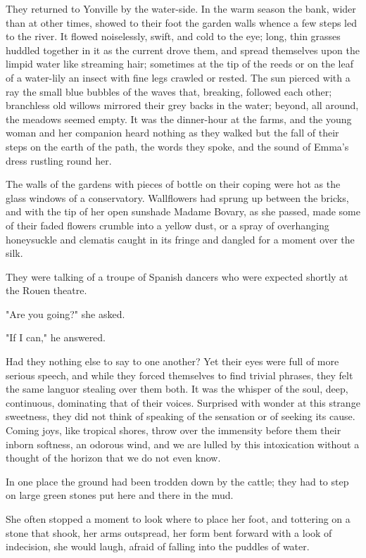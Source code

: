\documentclass[11pt,twocolumn]{ltugboat}
\begin{document}
They returned to Yonville by the water-side. In the warm season the
bank, wider than at other times, showed to their foot the garden walls
whence a few steps led to the river. It flowed noiselessly, swift,
and cold to the eye; long, thin grasses huddled together in it as the
current drove them, and spread themselves upon the limpid water like
streaming hair; sometimes at the tip of the reeds or on the leaf of a
water-lily an insect with fine legs crawled or rested. The sun pierced
with a ray the small blue bubbles of the waves that, breaking, followed
each other; branchless old willows mirrored their grey backs in
the water; beyond, all around, the meadows seemed empty. It was the
dinner-hour at the farms, and the young woman and her companion heard
nothing as they walked but the fall of their steps on the earth of the
path, the words they spoke, and the sound of Emma's dress rustling round
her.

The walls of the gardens with pieces of bottle on their coping were
hot as the glass windows of a conservatory. Wallflowers had sprung up
between the bricks, and with the tip of her open sunshade Madame Bovary,
as she passed, made some of their faded flowers crumble into a yellow
dust, or a spray of overhanging honeysuckle and clematis caught in its
fringe and dangled for a moment over the silk.

They were talking of a troupe of Spanish dancers who were expected
shortly at the Rouen theatre.

"Are you going?" she asked.

"If I can," he answered.

Had they nothing else to say to one another? Yet their eyes were full
of more serious speech, and while they forced themselves to find trivial
phrases, they felt the same languor stealing over them both. It was the
whisper of the soul, deep, continuous, dominating that of their voices.
Surprised with wonder at this strange sweetness, they did not think of
speaking of the sensation or of seeking its cause. Coming joys, like
tropical shores, throw over the immensity before them their inborn
softness, an odorous wind, and we are lulled by this intoxication
without a thought of the horizon that we do not even know.

In one place the ground had been trodden down by the cattle; they had to
step on large green stones put here and there in the mud.

She often stopped a moment to look where to place her foot, and
tottering on a stone that shook, her arms outspread, her form bent
forward with a look of indecision, she would laugh, afraid of falling
into the puddles of water.
\end{document}
